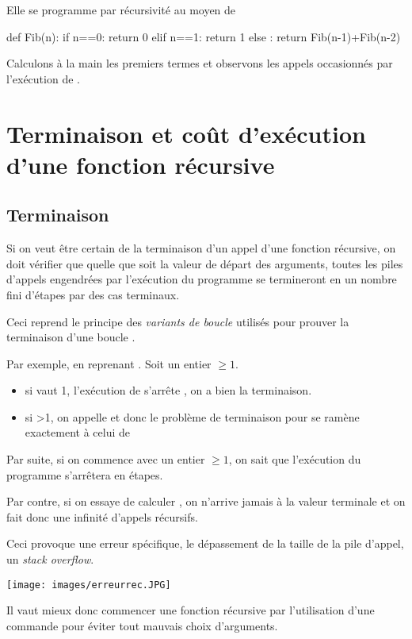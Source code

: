 \documentclass[11pt,a4paper,french,twoside]{PMCours}
\begin{document}
Elle se programme par récursivité au moyen de 

\begin{Python}
def Fib(n):
	if n==0:
		return 0
	elif n==1:
		return 1
	else :
		return Fib(n-1)+Fib(n-2)
\end{Python}

Calculons à la main les premiers termes et observons les appels occasionnés
par l'exécution de .
\vspace{7cm}

\section{Terminaison et coût d'exécution d'une fonction récursive}
\subsection{Terminaison} 
Si on veut être certain de la terminaison d'un appel d'une fonction récursive,
on doit vérifier que quelle que soit la valeur de départ des arguments, 
toutes les piles d'appels engendrées par l'exécution du programme se termineront
en un nombre fini d'étapes par des cas terminaux.

Ceci reprend le principe des {\em variants de boucle} utilisés pour prouver 
la terminaison d'une boucle .

Par exemple, en reprenant . Soit  un entier $\geq1$.
\begin{itemize}
\item si  vaut 1, l'exécution de  s'arrête , 
on a bien la terminaison.
\item si >1, on appelle  et donc le problème 
de terminaison pour  se ramène exactement à celui 
de  
\end{itemize}
Par suite, si on commence avec un entier $\geq1$,
on sait que l'exécution du programme s'arrêtera en   étapes.

Par contre, si on essaye de calculer , on n'arrive 
jamais à la valeur terminale et on fait donc une infinité d'appels récursifs. 

Ceci provoque une erreur spécifique, le dépassement de la taille de la pile 
d'appel, un \emph{stack overflow}.
 
\texttt{[image: images/erreurrec.JPG]}    

Il vaut mieux donc commencer une fonction récursive par l'utilisation d'une commande
 pour éviter tout mauvais choix d'arguments.
\end{document}
